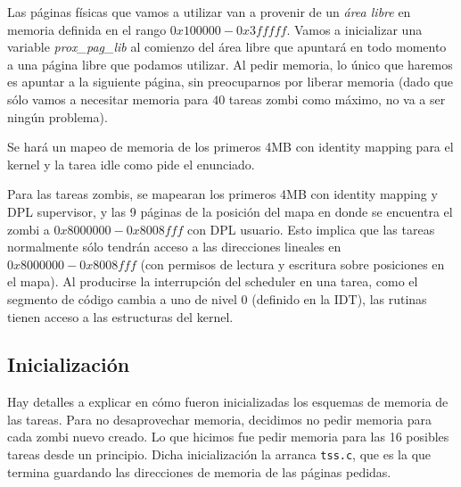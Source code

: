 \documentclass{article}
\begin{document}
	Las páginas físicas que vamos a utilizar van a provenir de un \textit{área libre} en memoria definida en el rango $0x100000 - 0x3fffff$. Vamos a inicializar una variable \textit{prox\_pag\_lib} al comienzo del área libre que apuntará en todo momento a una página libre que podamos utilizar. Al pedir memoria, lo único que haremos es apuntar a la siguiente página, sin preocuparnos por liberar memoria (dado que sólo vamos a necesitar memoria para $40$ tareas zombi como máximo, no va a ser ningún problema).
	
	Se hará un mapeo de memoria de los primeros 4MB con identity mapping para el kernel y la tarea idle como pide el enunciado.
	
	Para las tareas zombis, se mapearan los primeros 4MB con identity mapping y DPL supervisor, y las 9 páginas de la posición del mapa en donde se encuentra el zombi a $0x8000000 - 0x8008fff$ con DPL usuario. Esto implica que las tareas normalmente sólo tendrán acceso a las direcciones lineales en $0x8000000 - 0x8008fff$ (con permisos de lectura y escritura sobre posiciones en el mapa). Al producirse la interrupción del scheduler en una tarea, como el segmento de código cambia a uno de nivel 0 (definido en la IDT), las rutinas tienen acceso a las estructuras del kernel.
	
	\subsection{Inicialización}
	
	Hay detalles a explicar en cómo fueron inicializadas los esquemas de memoria de las tareas. Para no desaprovechar memoria, decidimos no pedir memoria para cada zombi nuevo creado. Lo que hicimos fue pedir memoria para las 16 posibles tareas desde un principio. Dicha inicialización la arranca \texttt{tss.c}, que es la que termina guardando las direcciones de memoria de las páginas pedidas.
	

	
\end{document}
